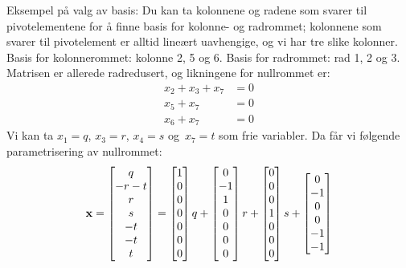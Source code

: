 \begin{losning}
\begin{punkt}
\noindent
Eksempel på valg av basis: Du kan ta kolonnene og radene som svarer til pivotelementene for å finne basis for kolonne- og radrommet; kolonnene som svarer til pivotelement er alltid lineært uavhengige, og vi har tre slike kolonner. Basis for kolonnerommet: kolonne 2, 5 og 6. Basis for radrommet: rad 1, 2 og 3. Matrisen er allerede radredusert, og likningene for nullrommet er:
\begin{align*}
x_2+x_3+x_7 &= 0 \\
x_5+x_7 &= 0 \\
x_6+x_7 &= 0
\end{align*}
Vi kan ta $x_1=q$, $x_3=r$, $x_4=s$ og~$x_7=t$ som frie variabler.
Da får vi følgende parametrisering av nullrommet:
\[
\mathbf{x}
=
\begin{bmatrix}
q \\
-r - t \\
r \\
s \\
-t \\
-t \\
t
\end{bmatrix}
=
\begin{bmatrix}
1\\
0\\
0\\
0\\
0\\
0\\
0
\end{bmatrix}
q
+
\begin{bmatrix}
0\\
-1\\
1\\
0\\
0\\
0\\
0
\end{bmatrix}
r
+
\begin{bmatrix}
0\\
0\\
0\\
1\\
0\\
0\\
0
\end{bmatrix}
s
+
\begin{bmatrix}
0\\
-1\\
0\\
0\\
-1\\
-1\\

\end{bmatrix}\]
\end{punkt}
\end{losning}
